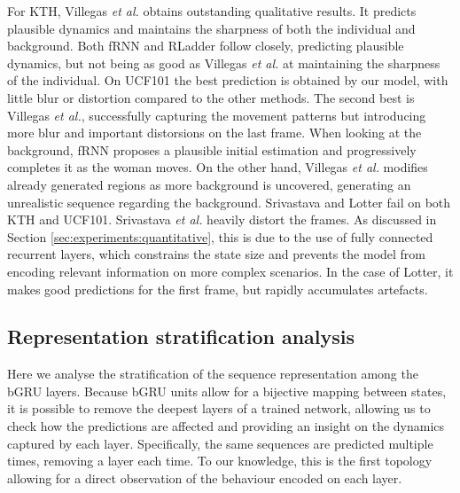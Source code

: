 \documentclass[runningheads]{llncs}
\begin{document}
For KTH, Villegas \emph{et al.} obtains outstanding qualitative results. It predicts plausible dynamics and maintains the sharpness of both the individual and background. Both fRNN and RLadder follow closely, predicting plausible dynamics, but not being as good as Villegas \emph{et al.} at maintaining the sharpness of the individual. On UCF101 the best prediction is obtained by our model, with little blur or distortion compared to the other methods. The second best is Villegas \emph{et al.}, successfully capturing the movement patterns but introducing more blur and important distorsions on the last frame. When looking at the background, fRNN proposes a plausible initial estimation and progressively completes it as the woman moves. On the other hand, Villegas \emph{et al.} modifies already generated regions as more background is uncovered, generating an unrealistic sequence regarding the background. Srivastava and Lotter fail on both KTH and UCF101. Srivastava \emph{et al.} heavily distort the frames. As discussed in Section \ref{sec:experiments:quantitative}, this is due to the use of fully connected recurrent layers, which constrains the state size and prevents the model from encoding relevant information on more complex scenarios. In the case of Lotter, it makes good predictions for the first frame, but rapidly accumulates artefacts.







\subsection{Representation stratification analysis}
\label{sec:experiments:stratification}

Here we analyse the stratification of the sequence representation among the bGRU layers. Because bGRU units allow for a bijective mapping between states, it is possible to remove the deepest layers of a trained network, allowing us to check how the predictions are affected and providing an insight on the dynamics captured by each layer. Specifically, the same sequences are predicted multiple times, removing a layer each time. To our knowledge, this is the first topology allowing for a direct observation of the behaviour encoded on each layer.
\end{document}
